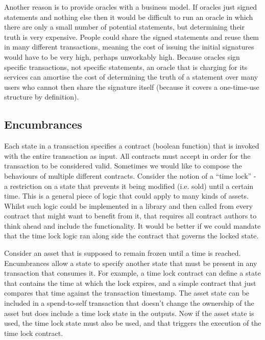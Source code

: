 \documentclass{article}
\begin{document}
Another reason is to provide oracles with a business model. If oracles just signed statements and nothing else then
it would be difficult to run an oracle in which there are only a small number of potential statements, but
determining their truth is very expensive. People could share the signed statements and reuse them in many different
transactions, meaning the cost of issuing the initial signatures would have to be very high, perhaps
unworkably high. Because oracles sign specific transactions, not specific statements, an oracle that is charging
for its services can amortise the cost of determining the truth of a statement over many users who cannot then
share the signature itself (because it covers a one-time-use structure by definition).

\subsection{Encumbrances}\label{sec:encumbrances}

Each state in a transaction specifies a contract (boolean function) that is invoked with the entire transaction as input. All contracts must accept
in order for the transaction to be considered valid. Sometimes we would like to compose the behaviours of multiple
different contracts. Consider the notion of a ``time lock'' - a restriction on a state that prevents it being
modified (i.e. sold) until a certain time. This is a general piece of logic that could apply to many kinds of
assets. Whilst such logic could be implemented in a library and then called from every contract that might want
to benefit from it, that requires all contract authors to think ahead and include the functionality. It would be
better if we could mandate that the time lock logic ran along side the contract that governs the locked state.

Consider an asset that is supposed to remain frozen until a time is reached. Encumbrances allow a state to specify another
state that must be present in any transaction that consumes it. For example, a time lock contract can define a state that
contains the time at which the lock expires, and a simple contract that just compares that time against the transaction
timestamp. The asset state can be included in a spend-to-self transaction that doesn't change the ownership of the asset
but does include a time lock state in the outputs. Now if the asset state is used, the time lock state must also be used, and
that triggers the execution of the time lock contract.
\end{document}
